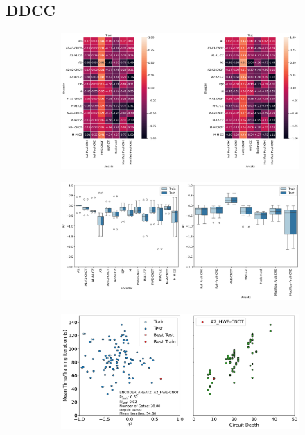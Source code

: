 \documentclass[journal=jacsat,manuscript=article]{achemso}
\begin{document}
\subsection{DDCC}




\begin{figure}[H]
	\centering	
	\begin{subfigure}[b]{0.49\textwidth}
		\centering
		\includegraphics[width=\linewidth]{../images/DDCC/DDCC_heatplots}
		\caption{}
		\label{fig:ddccheatplots}
	\end{subfigure}
	\hfill	
	\begin{subfigure}[b]{0.49\textwidth}
		\centering
		\includegraphics[width=\linewidth]{../images/DDCC/DDCC_boxplots}
		\caption{}
		\label{fig:ddccboxplots}
	\end{subfigure}
	\hfill
	\begin{subfigure}[b]{0.49\textwidth}
		\centering
		\includegraphics[width=\linewidth]{../images/DDCC/AllDDCC5_circuitdepth_R2_vs_iterationtime}
		\caption{}
		\label{fig:allddcc5circuitdepthr2vsiterationtime}
	\end{subfigure}	
	\caption{}
	\label{fig:ddcc_all_analysis}	
\end{figure}
\end{document}
